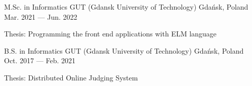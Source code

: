 
\begin{cventries}

  \cventry
    {M.Sc. in Informatics} %
    {GUT (Gdansk University of Technology)} %
    {Gdańsk, Poland} %
    {Mar. 2021 --- Jun. 2022} %
    {
      \begin{cvitems} %
        \item {Thesis: Programming the front end applications with ELM language}
      \end{cvitems}
    }

  \cventry
    {B.S. in Informatics} %
    {GUT (Gdansk University of Technology)} %
    {Gdańsk, Poland} %
    {Oct. 2017 --- Feb. 2021} %
    {
      \begin{cvitems} %
        \item {Thesis: Distributed Online Judging System}
      \end{cvitems}
    }

\end{cventries}
